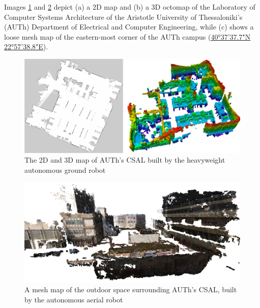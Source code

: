 \begin{minipage}[t][\textheight]{\textwidth}
Images \ref{fig:csal_maps} and \ref{fig:e_map} depict (a) a 2D map and (b) a 3D
octomap of the Laboratory of Computer Systems Architecture of the Aristotle
University of Thessaloniki's (AUTh) Department of Electrical and Computer
Engineering, while (c) shows a loose mesh map of the eastern-most corner of
the AUTh campus (\href{https://maps.app.goo.gl/zDzM8HKzkMiFyHMJ6}{40°37'37.7"N
22°57'38.8"E}).

\vfill

\begin{figure}[H]\centering
  \includegraphics[scale=0.4]{images/relief/csal_maps.png}
  \caption{\small The 2D and 3D map of AUTh's CSAL built by the heavyweight
           autonomous ground robot}
  \label{fig:csal_maps}
\end{figure}

\vfill

\begin{figure}[H]\centering
  \includegraphics[scale=0.3]{images/relief/e_map.png}
  \caption{\small A mesh map of the outdoor space surrounding AUTh's CSAL,
           built by the autonomous aerial robot}
  \label{fig:e_map}
\end{figure}
\end{minipage}


